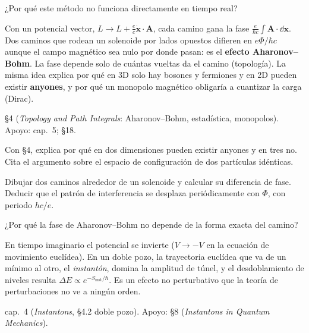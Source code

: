 ¿Por qué este método no funciona directamente en tiempo real?


Con un potencial vector, $L\to L+\tfrac{e}{c}\dot{\mathbf x}\cdot\mathbf A$, cada camino gana la fase $\tfrac{e}{\hbar c}\int\mathbf A\cdot\dd\mathbf x$. Dos caminos que rodean un solenoide por lados opuestos difieren en $e\Phi/\hbar c$ aunque el campo magnético sea nulo por donde pasan: es el \textbf{efecto Aharonov--Bohm}. La fase depende solo de cuántas vueltas da el camino (topología). La misma idea explica por qué en 3D solo hay bosones y fermiones y en 2D pueden existir \textbf{anyones}, y por qué un monopolo magnético obligaría a cuantizar la carga (Dirac).

 \S4 (\textit{Topology and Path Integrals}: Aharonov--Bohm, estadística, monopolos). Apoyo:  cap.~5;  \S18.

\begin{prompt}
Con  \S4, explica por qué en dos dimensiones pueden existir anyones y en tres no. Cita el argumento sobre el espacio de configuración de dos partículas idénticas.
\end{prompt}

Dibujar dos caminos alrededor de un solenoide y calcular su diferencia de fase. Deducir que el patrón de interferencia se desplaza periódicamente con $\Phi$, con periodo $hc/e$.

¿Por qué la fase de Aharonov--Bohm no depende de la forma exacta del camino?


En tiempo imaginario el potencial se invierte ($V\to-V$ en la ecuación de movimiento euclídea). En un doble pozo, la trayectoria euclídea que va de un mínimo al otro, el \emph{instantón}, domina la amplitud de túnel, y el desdoblamiento de niveles resulta $\Delta E\propto e^{-S_{\text{inst}}/\hbar}$. Es un efecto no perturbativo que la teoría de perturbaciones no ve a ningún orden.

 cap.~4 (\textit{Instantons}, \S4.2 doble pozo). Apoyo:  \S8 (\textit{Instantons in Quantum Mechanics}).

